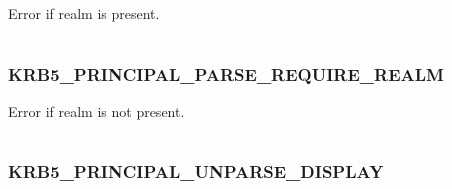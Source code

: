 \documentclass[letterpaper,10pt,english]{sphinxmanual}
\begin{document}
Error if realm is present.

\begin{tabulary}{\linewidth}{|L|L|}
\hline

 & 
\\
\hline\end{tabulary}



\subsubsection{KRB5\_PRINCIPAL\_PARSE\_REQUIRE\_REALM}
\label{appdev/refs/macros/KRB5_PRINCIPAL_PARSE_REQUIRE_REALM::doc}\label{appdev/refs/macros/KRB5_PRINCIPAL_PARSE_REQUIRE_REALM:krb5-principal-parse-require-realm}\label{appdev/refs/macros/KRB5_PRINCIPAL_PARSE_REQUIRE_REALM:krb5-principal-parse-require-realm-data}

\begin{fulllineitems}
\label{appdev/refs/macros/KRB5_PRINCIPAL_PARSE_REQUIRE_REALM:KRB5_PRINCIPAL_PARSE_REQUIRE_REALM}
\end{fulllineitems}


Error if realm is not present.

\begin{tabulary}{\linewidth}{|L|L|}
\hline

 & 
\\
\hline\end{tabulary}



\subsubsection{KRB5\_PRINCIPAL\_UNPARSE\_DISPLAY}
\label{appdev/refs/macros/KRB5_PRINCIPAL_UNPARSE_DISPLAY::doc}\label{appdev/refs/macros/KRB5_PRINCIPAL_UNPARSE_DISPLAY:krb5-principal-unparse-display-data}\label{appdev/refs/macros/KRB5_PRINCIPAL_UNPARSE_DISPLAY:krb5-principal-unparse-display}

\begin{fulllineitems}
\label{appdev/refs/macros/KRB5_PRINCIPAL_UNPARSE_DISPLAY:KRB5_PRINCIPAL_UNPARSE_DISPLAY}
\end{fulllineitems}
\end{document}
